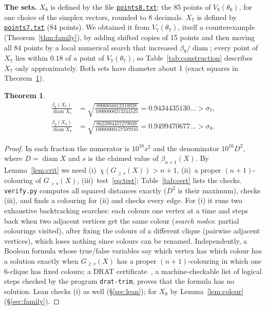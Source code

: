 \documentclass[10pt,a4paper,reqno]{amsart}
\newtheorem{theorem}{Theorem}
\DeclareMathOperator{\diam}{diam}
\newcommand{\repo}{https://github.com/Sager611/riemann/blob/a85a25ee1578748e7fa014f51dd762a6195fe923/}
\newcommand{\file}[2]{\href{\repo #2}{\texttt{#1}}}
\begin{document}
\smallskip
\noindent\textbf{The sets.} $X_8$ is defined by the file \file{points8.txt}{Riemann/Deep/Gale7/points8.txt}: the 85 points of $V_8(\theta_8)$, for one choice of the simplex vectors, rounded to 8 decimals. $X_7$ is defined by \file{points7.txt}{Riemann/Deep/Gale7/points7.txt} (84 points). We obtained it from $V_7(\theta_7)$, itself a counterexample (Theorem~\ref{thm:family}), by adding shifted copies of 15 points and then moving all 84 points by a local numerical search that increased $\beta_8/\diam$; every point of $X_7$ lies within $0.18$ of a point of $V_7(\theta_7)$, so Table~\ref{tab:construction} describes $X_7$ only approximately. Both sets have diameter about 1 (exact squares in Theorem~\ref{thm:x78}).

\begin{theorem}\label{thm:x78}
\begin{align*}
\frac{\beta_8(X_7)}{\diam X_7}&=\sqrt{\frac{8900856812318928}{10000000213244525}}=0.9434435130\ldots>\sigma_7,\\
\frac{\beta_9(X_8)}{\diam X_8}&=\sqrt{\frac{9023994457279939}{10000000157507010}}=0.9499470677\ldots>\sigma_8.
\end{align*}
\end{theorem}

\begin{proof}
 In each fraction the numerator is $10^{16}s^2$ and the denominator $10^{16}D^2$, where $D=\diam X$ and $s$ is the claimed value of $\beta_{n+1}(X)$. By Lemma~\ref{lem:crit} we need (i)~$\chi(G_{\ge s}(X))>n+1$, (ii)~a proper $(n+1)$-colouring of $G_{>s}(X)$, (iii)~test~\eqref{eq:test}; Table~\ref{tab:cert} lists the checks. \texttt{verify.py} computes all squared distances exactly ($D^2$ is their maximum), checks (iii), and finds a colouring for (ii) and checks every edge. For (i) it runs two exhaustive backtracking searches: each colours one vertex at a time and steps back when two adjacent vertices get the same colour (\emph{search nodes}: partial colourings visited), after fixing the colours of a different clique (pairwise adjacent vertices), which loses nothing since colours can be renamed. Independently, a Boolean formula whose true/false variables say which vertex has which colour has a solution exactly when $G_{\ge s}(X)$ has a proper $(n+1)$-colouring in which one 6-clique has fixed colours; a DRAT certificate~\cite{WHH14}, a machine-checkable list of logical steps checked by the program \texttt{drat-trim}, proves that the formula has no solution. Lean checks (i) as well (\S\ref{sec:lean}); for $X_8$ by Lemma~\ref{lem:colour} (\S\ref{sec:family}).
\end{proof}
\end{document}
